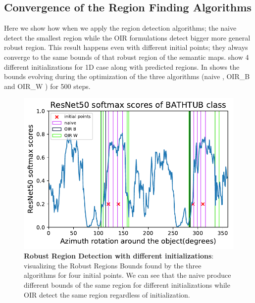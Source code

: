 \subsection{Convergence of the Region Finding Algorithms}
Here we show how when we apply the region detection algorithms; the naive detect the smallest region while the OIR formulations detect bigger more general robust region. This result happens even with different initial points; they always converge to the same bounds of that robust region of the semantic maps. \figLabel{\ref{fig:converge}} show 4 different initializations for 1D case  along with predicted regions. In \figLabel{\ref{fig:conv1},\ref{fig:conv2}} shows the bounds evolving during the optimization of the three algorithms (naive , OIR\_B and OIR\_W ) for 500 steps.
\begin{figure}[h]
\centering
\tabcolsep=0.03cm
\includegraphics[width = \textwidth]{supimages/converge/1D_bathtub_regions.pdf}
   \caption{\small \textbf{Robust Region Detection with different initializations}: visualizing the Robust Regions Bounds found by the three algorithms for four initial points. We can see that the naive produce different bounds of the same region for different initializations while OIR detect the same region regardless of initialization.}
   \vspace{-8pt}
   \label{fig:converge}
\end{figure}
